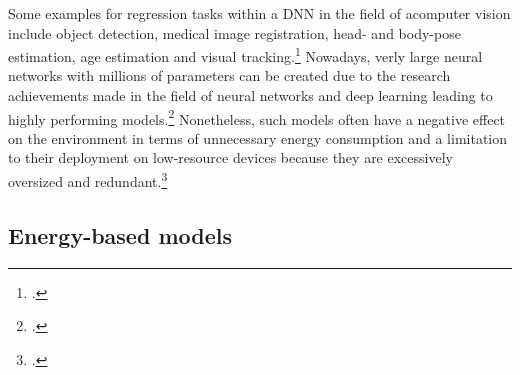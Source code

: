 Some examples for regression tasks within a \ac{DNN} in the field of acomputer vision include object detection, medical image registration, head- and body-pose estimation, age estimation and visual tracking.\footcite[cf.][325-326]{gustafssonEnergyBasedModelsDeep2020}
Nowadays, verly large neural networks with millions of parameters can be created due to the research achievements made in the field of neural networks and deep learning leading to highly performing models.\footcite[cf.][152]{marinoDeepNeuralNetworks2023}
Nonetheless, such models often have a negative effect on the environment in terms of unnecessary energy consumption and a limitation to their deployment on low-resource devices because they are excessively oversized and redundant.\footcite[cf.][152]{marinoDeepNeuralNetworks2023}


\subsection{Energy-based models}

